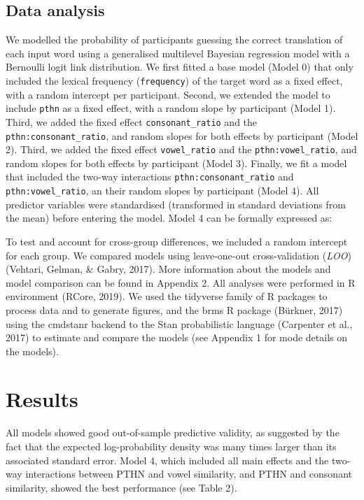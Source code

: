 \documentclass[
  english,
  man,floatsintext]{apa6}
\begin{document}
\hypertarget{data-analysis}{%
\subsection{Data analysis}\label{data-analysis}}

We modelled the probability of participants guessing the correct translation of each input word using a generalised multilevel Bayesian regression model with a Bernoulli logit link distribution. We first fitted a base model (Model 0) that only included the lexical frequency (\texttt{frequency}) of the target word as a fixed effect, with a random intercept per participant. Second, we extended the model to include \texttt{pthn} as a fixed effect, with a random slope by participant (Model 1). Third, we added the fixed effect \texttt{consonant\_ratio} and the \texttt{pthn:consonant\_ratio}, and random slopes for both effects by participant (Model 2). Third, we added the fixed effect \texttt{vowel\_ratio} and the \texttt{pthn:vowel\_ratio}, and random slopes for both effects by participant (Model 3). Finally, we fit a model that included the two-way interactions \texttt{pthn:consonant\_ratio} and \texttt{pthn:vowel\_ratio}, an their random slopes by participant (Model 4). All predictor variables were standardised (transformed in standard deviations from the mean) before entering the model. Model 4 can be formally expressed as:

To test and account for cross-group differences, we included a random intercept for each group. We compared models using leave-one-out cross-validation (\emph{LOO}) (Vehtari, Gelman, \& Gabry, 2017). More information about the models and model comparison can be found in Appendix 2. All analyses were performed in R environment (RCore, 2019). We used the tidyverse family of R packages to process data and to generate figures, and the brms R package (Bürkner, 2017) using the cmdstanr backend to the Stan probabilistic language (Carpenter et al., 2017) to estimate and compare the models (see Appendix 1 for mode details on the models).

\hypertarget{results}{%
\section{Results}\label{results}}

All models showed good out-of-sample predictive validity, as suggested by the fact that the expected log-probability density was many times larger than its associated standard error. Model 4, which included all main effects and the two-way interactions between PTHN and vowel similarity, and PTHN and consonant similarity, showed the best performance (see Table 2).
\end{document}
